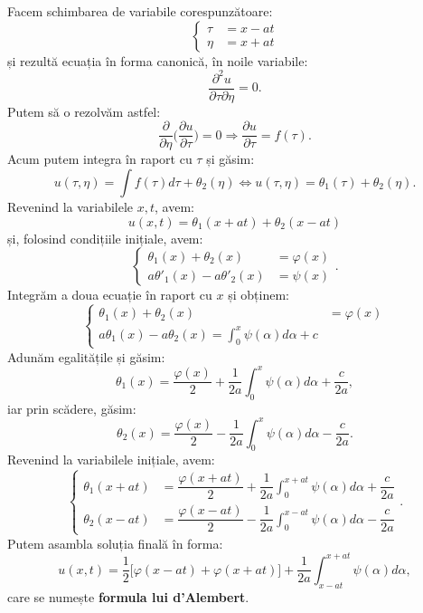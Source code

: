 Facem schimbarea de variabile corespunzătoare:
\[
    \begin{cases}
        \tau &= x - at \\
        \eta &= x + at
    \end{cases}
\]
și rezultă ecuația în forma canonică, în noile variabile:
\[
    \dfrac{\partial^2 u}{\partial \tau \partial \eta} = 0.
\]
Putem să o rezolvăm astfel:
\[
    \dfrac{\partial}{\partial \eta} \Big( \dfrac{\partial u}{\partial \tau} \Big) = 0 \Rightarrow %
    \dfrac{\partial u}{\partial \tau} = f(\tau).
\]
Acum putem integra în raport cu $ \tau $ și găsim:
\[
    u(\tau, \eta) = \int f(\tau) d\tau + \theta_2(\eta) \Leftrightarrow %
    u(\tau, \eta) = \theta_1(\tau) + \theta_2(\eta).
\]
Revenind la variabilele $ x, t $, avem:
\[
    u(x, t) = \theta_1(x + at) + \theta_2(x - at)
\]
și, folosind condițiile inițiale, avem:
\[
    \begin{cases}
        \theta_1(x) + \theta_2(x) &= \varphi(x) \\
        a\theta'_1(x) - a\theta'_2(x) &= \psi(x)
    \end{cases}.
\]
Integrăm a doua ecuație în raport cu $ x $ și obținem:
\[
    \begin{cases}
        \theta_1(x) + \theta_2(x) &= \varphi(x) \\
        a\theta_1(x) - a\theta_2(x) = \int_0^x \psi(\alpha) d\alpha + c
    \end{cases}
\]
Adunăm egalitățile și găsim:
\[
    \theta_1(x) = \dfrac{\varphi(x)}{2} + \dfrac{1}{2a} \int_0^x \psi(\alpha) d\alpha + \dfrac{c}{2a},
\]
iar prin scădere, găsim:
\[
    \theta_2(x) = \dfrac{\varphi(x)}{2} - \dfrac{1}{2a} \int_0^x \psi(\alpha) d\alpha - \dfrac{c}{2a}.
\]
Revenind la variabilele inițiale, avem:
\[
    \begin{cases}
        \theta_1(x + at) &= \dfrac{\varphi(x + at)}{2} + %
        \dfrac{1}{2a} \int_0^{x + at} \psi(\alpha) d\alpha + \dfrac{c}{2a} \\
        \theta_2(x - at) &= \dfrac{\varphi(x - at)}{2} - %
        \dfrac{1}{2a} \int_0^{x - at} \psi(\alpha) d\alpha - \dfrac{c}{2a}
    \end{cases}.
\]
Putem asambla soluția finală în forma:
\begin{equation} \label{eq:dalembert}
    u(x, t) = \dfrac{1}{2} \big[ \varphi(x - at) + \varphi(x + at) \big] + %
    \dfrac{1}{2a} \int_{x - at}^{x + at} \psi(\alpha) d\alpha,
\end{equation}
care se numește \textbf{formula lui d'Alembert}.

